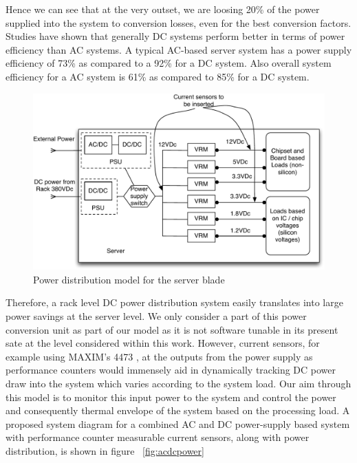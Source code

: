 \documentclass[times, 10pt,onecolumn]{article}
\begin{document}
Hence we can see that at the very outset, we are loosing 20\% of the
power supplied into the system to conversion losses, even for the best
conversion factors. Studies have shown \cite{ton2008} that generally DC
systems perform better in terms of power efficiency than AC systems. A
typical AC-based server system has a power supply efficiency of 73\% as
compared to a 92\% for a DC system. Also overall system efficiency for a
AC system is 61\% as compared to 85\% for a DC system.

\begin{figure}[htbp]
\begin{center}
\includegraphics[scale=0.50]{acdcpower2.pdf}
\caption{Power distribution model for the server blade}
\label{fig:acdcpwr}
\end{center}
\end{figure}

Therefore, a rack level DC power distribution system easily translates
into large power savings at the server level.  We only consider a part
of this power conversion unit as part of our model as it is not software
tunable in its present sate at the level considered within this
work. However, current sensors, for example using MAXIM's 4473
\cite{maxim2006}, at the outputs from the power supply as performance
counters would immensely aid in dynamically tracking DC power draw into
the system which varies according to the system load.  Our aim through
this model is to monitor this input power to the system and control the
power and consequently thermal envelope of the system based on the
processing load. A proposed system diagram for a combined AC and DC
power-supply based system with performance counter measurable current
sensors, along with power distribution, is shown in figure
~\ref{fig:acdcpower}
\end{document}
